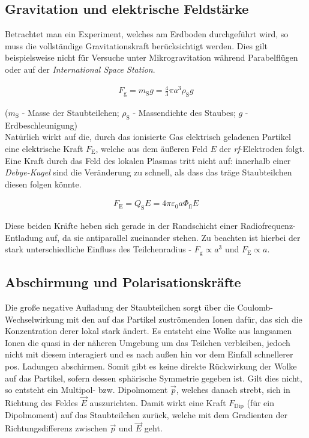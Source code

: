 \documentclass[numbers=noenddot,a4paper,notitlepage,twoside,BCOR15mm]{scrbook}
\newcommand{\ix}[1]{_\text{#1}}
\newcommand{\tilt}[1]{\textit{#1}}
\begin{document}
			\subsection{Gravitation und elektrische Feldstärke}\label{subsub:grav}

			Betrachtet man ein Experiment, welches am Erdboden durchgeführt wird, so muss die vollständige Gravitationskraft berücksichtigt werden. Dies gilt beispielsweise nicht für Versuche unter Mikrogravitation während Parabelflügen oder auf der \tilt{International Space Station}.

				\begin{align}
					F\ix{g}=m\ix{S} g=\frac{4}{3}\pi a^3 \rho\ix{S} g
				\end{align}

			($m\ix{S}$ - Masse der Staubteilchen; $\rho\ix{S}$ - Massendichte des Staubes; $g$ - Erdbeschleunigung)\\
			Natürlich wirkt auf die, durch das ionisierte Gas elektrisch geladenen Partikel eine elektrische Kraft $F\ix{E}$, welche aus dem äußeren Feld $E$ der \tilt{rf}-Elektroden folgt. Eine Kraft durch das Feld des lokalen Plasmas tritt nicht auf: innerhalb einer \tilt{Debye-Kugel} sind die Veränderung zu schnell, als dass das träge Staubteilchen diesen folgen könnte. 

				\begin{align}
				F\ix{E}=Q\ix{S} E=4 \pi \varepsilon\ix{0} a \Phi\ix{fl} E
				\end{align}

			Diese beiden Kräfte heben sich gerade in der Randschicht einer Radiofrequenz-Entladung auf, da sie antiparallel zueinander stehen. Zu beachten ist hierbei der stark unterschiedliche Einfluss des Teilchenradius - $F\ix{g}\propto a^3$ und $F\ix{E}\propto a$.\\

			\subsection{Abschirmung und Polarisationskräfte}\label{subsub:abschirm}

			Die große negative Aufladung der Staubteilchen sorgt über die Coulomb-Wechselwirkung mit den auf das Partikel zuströmenden Ionen dafür, das sich die Konzentration derer lokal stark ändert. Es entsteht eine Wolke aus langsamen Ionen die quasi in der näheren Umgebung um das Teilchen verbleiben, jedoch nicht mit diesem interagiert und es nach außen hin vor dem Einfall schnellerer pos. Ladungen abschirmen. Somit gibt es keine direkte Rückwirkung der Wolke auf das Partikel, sofern dessen sphärische Symmetrie gegeben ist. Gilt dies nicht, so entsteht ein Multipol- bzw. Dipolmoment $\vec{p}$, welches danach strebt, sich in Richtung des Feldes $\vec{E}$ auszurichten. Damit wirkt eine Kraft $F\ix{Dip}$ (für ein Dipolmoment) auf das Staubteilchen zurück, welche mit dem Gradienten der Richtungsdifferenz zwischen $\vec{p}$ und $\vec{E}$ geht.
\end{document}
